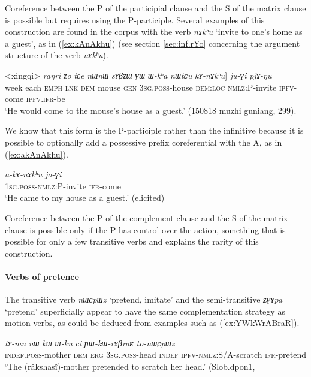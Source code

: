 \documentclass[oneside,a4paper,11pt]{article}
\newcommand{\ipa}[1]{\textit{\phon#1}}
\newcommand{\jpg}[2]{\ipa{#1} `#2'}
\newcommand{\refb}[1]{(\ref{#1})}
\begin{document}
Coreference between the P of the participial clause and the S of the matrix clause is possible but requires using the P-participle. Several examples of this construction are found in the corpus with the verb \jpg{nɤkʰu}{invite to one's home as a guest}, as in \refb{ex:kAnAkhu} (see section \ref{sec:inf.rYo} concerning the argument structure of the verb \ipa{nɤkʰu}).

\begin{exe}
\ex \label{ex:kAnAkhu}
\gll <xingqi> 	\ipa{raŋri} 	\ipa{ʑo} 	\ipa{tɕe} 	\ipa{nɯnɯ} \ipa{sɤβʑɯ} 	\ipa{ɣɯ} 	\ipa{ɯ-kʰa} 	\ipa{nɯtɕu} 	\ipa{kɤ-nɤkʰu}] 	\ipa{ju-ɣi} 	\ipa{pjɤ-ŋu} \\
week each \textsc{emph} \textsc{lnk} \textsc{dem} mouse \textsc{gen} \textsc{3sg.poss}-house \textsc{dem:loc} \textsc{nmlz:P}-invite \textsc{ipfv}-come \textsc{ipfv.ifr}-be \\
\glt `He would come to the mouse's house as a guest.' (150818 muzhi guniang, 299).
\end{exe}

We know that this form is the P-participle rather than the infinitive because it is possible to optionally add a possessive prefix coreferential with the A, as in (\ref{ex:akAnAkhu}).

\begin{exe}
\ex \label{ex:akAnAkhu}
\gll 
\ipa{a-kɤ-nɤkʰu} 	\ipa{jo-ɣi}  \\
 \textsc{1sg.poss-nmlz:P}-invite \textsc{ifr}-come \\
\glt `He came to my house as a guest.' (elicited)
\end{exe}

Coreference between the P of the complement clause and the S of the matrix clause is possible only if the P has control over the action, something that is possible for only a few transitive verbs and explains the rarity of this construction. 
    
\paragraph{Verbs of pretence} \label{sec:relative.q}
The transitive verb \jpg{nɯɕpɯz}{pretend, imitate} and the semi-transitive \jpg{ʑɣɤpa}{pretend} superficially appear to have the same complementation strategy as motion verbs, as could be deduced from examples such as (\ref{ex:YWkWrABraR}). 

\begin{exe}
\ex \label{ex:YWkWrABraR}
\gll \ipa{tɤ-mu} 	\ipa{nɯ} 	\ipa{kɯ} 	\ipa{ɯ-ku} 	\ipa{ci} 	\ipa{ɲɯ-kɯ-rɤβraʁ} 	\ipa{to-nɯɕpɯz} \\
\textsc{indef.poss}-mother \textsc{dem} \textsc{erg} \textsc{3sg.poss}-head \textsc{indef} \textsc{ipfv-nmlz}:S/A-scratch \textsc{ifr}-pretend \\
\glt `The (râkshasî)-mother pretended to scratch her head.' (Slob.dpon1, 
\end{exe}
\end{document}
